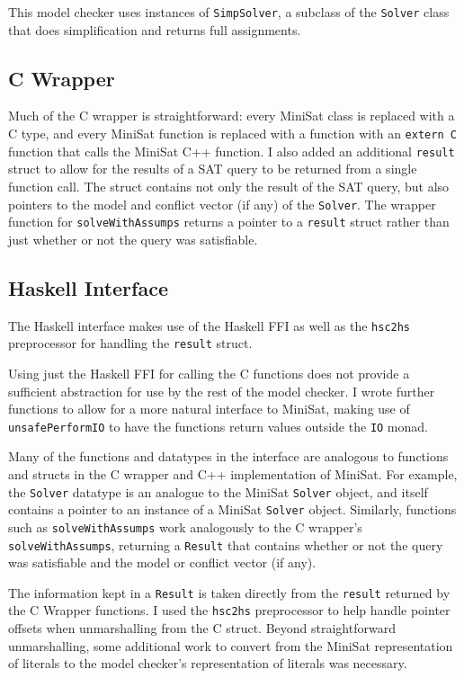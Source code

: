 \documentclass[12pt,a4paper,twoside,openright]{report}
\begin{document}
This model checker uses instances of \verb,SimpSolver,, a subclass of the \verb,Solver, class
that does simplification and returns full assignments.

\subsection{C Wrapper}

Much of the C wrapper is straightforward: every MiniSat class is replaced with a C type,
and every MiniSat function is replaced with a function with an \verb,extern C, function that
calls the MiniSat C++ function.
I also added an additional \verb,result, struct to allow for the results of a SAT query to
be returned from a single function call. The struct contains not only the result of the SAT
query, but also pointers to the model and conflict vector (if any) of the \verb,Solver,.
The wrapper function for \verb,solveWithAssumps, returns a pointer to a \verb,result, struct
rather than just whether or not the query was satisfiable.

\subsection{Haskell Interface}

The Haskell interface makes use of the Haskell FFI as well as the \verb,hsc2hs, preprocessor
for handling the \verb,result, struct.

Using just the Haskell FFI for calling the C functions does not provide a
sufficient abstraction for use by the rest of the model checker.
I wrote further functions to allow for a more natural interface to MiniSat,
 making use of \verb,unsafePerformIO, to have the functions return
values outside the \verb,IO, monad.

Many of the functions and datatypes in the interface are analogous to functions and structs in
the C wrapper and C++ implementation of MiniSat. For example, the \verb,Solver, datatype is an
analogue to the MiniSat \verb,Solver, object, and itself contains a pointer to an instance of
a MiniSat \verb,Solver, object. Similarly, functions such as \verb,solveWithAssumps, work
analogously to the C wrapper's \verb,solveWithAssumps,, returning a \verb,Result, that contains
whether or not the query was satisfiable and the model or conflict vector (if any).

The information kept in a \verb,Result, is taken directly from the \verb,result, returned by
the C Wrapper functions. I used the \verb,hsc2hs, preprocessor to help handle pointer offsets
when unmarshalling from the C struct. Beyond straightforward unmarshalling, some additional work
to convert from the MiniSat representation of literals to the model checker’s representation of
literals was necessary.
\end{document}
